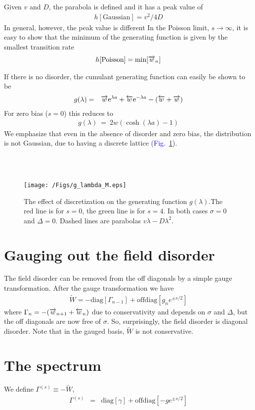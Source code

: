 \documentclass[aps,pre,floats,floatfix,fleqn,notitlepage]{revtex4-1}
\newcommand{\eexp}{\mbox{e}^}
\newcommand{\beq}{\begin{eqnarray}}
\newcommand{\eeq}{\end{eqnarray}}
\newcommand{\Fig}[1] {\textcolor{blue}{Fig.~\ref{#1}}} %
\newcommand{\ola}{\protect\overleftarrow}
\newcommand{\ora}{\protect\overrightarrow}
\begin{document}
Given $v$ and $D$, the parabola is defined and it has a peak value of 
%
\beq
h[\text{Gaussian}] = v^2/4D
\eeq
%
In general, however, the peak value is different 
In the Poisson limit, $s\to \infty$, it is easy to show that 
the minimum of the generating function is given by the smallest transition rate
%
\beq
h[\text{Poisson}] = \text{min}[\ora{w}_n]
\eeq



If there is no disorder, the cumulant generating function can easily be shown to be 
%
\beq
g(\lambda) &=& \ora{w} \eexp{\lambda a} + \ola{w} \eexp{-\lambda a} -(\ola{w}+\ora{w}) 
\eeq
%
For zero bias ($s=0$) this reduces to
%
\beq
g(\lambda) \ =  \ 2w(\cosh(\lambda a)-1)
\eeq
%
We emphasize that even in the absence of disorder and zero bias, 
the distribution is not Gaussian, due to having a discrete lattice (\Fig{fig4}).

\ \\ \ \\ 


\begin{figure}[h]
\texttt{[image: /Figs/g\_lambda\_M.eps]}

\caption{The effect of discretization  on the generating function $g(\lambda)$.The red line is for $s=0$, the green line is for $s=4$. 
In both cases $\sigma=0$ and $\Delta=0$.
Dashed lines are parabolas $v\lambda - D\lambda^2$.
}
\label{fig4}
\end{figure}

\clearpage
\section{Gauging out the field disorder}
The field disorder can be removed from the off diagonals by a simple gauge transformation.
After the gauge transformation we have
%
\beq
\tilde{W} = -\text{diag}[\Gamma_{n-1}] + \text{offdiag}[ g_n e^{\pm s/2}]
\eeq
%
where $\Gamma_n = -(\ora{w}_{n+1} + \ola{w}_n)$ due to conservativity and depends on $\sigma$ and $\Delta$, but the off diagonals are now free of $\sigma$. So, surprisingly, the field disorder 
is diagonal disorder.
Note that in the gauged basis, $\tilde{W}$ is not conservative.


\section{The spectrum}
We define $\Gamma^{(s)} \equiv -\tilde{W}$, 
%
\beq
\Gamma^{(s)} &=& \text{diag}[\gamma] + \text{offdiag}[ -ge^{\pm s/2}]
\eeq
%
\end{document}
